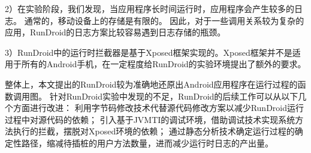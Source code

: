 2）在实验阶段，我们发现，当应用程序长时间运行时，应用程序会产生较多的日志。
通常的，移动设备上的存储是有限的。
因此，对于一些调用关系较为复杂的应用，RunDroid的日志方案比较容易遇到日志存储的瓶颈。

3）RunDroid中的运行时拦截器是基于Xposed框架实现的。Xposed框架并不是适用于所有的Android手机，在一定程度给RunDroid的实验环境提出了额外的要求。

整体上，本文提出的RunDroid较为准确地还原出Android应用程序在运行过程的函数调用图。
针对RunDroid实验中发现的不足，RunDroid的后续工作可以从以下几个方面进行改进：
利用字节码修改技术代替源代码修改方案以减少RunDroid运行过程中对源代码的依赖；
引入基于JVMTI的调试环境，借助调试技术实现系统方法执行的拦截，摆脱对Xposed环境的依赖；
通过静态分析技术确定运行过程的确定性路径，缩减待插桩的用户方法数量，进而减少运行时日志的产出量。